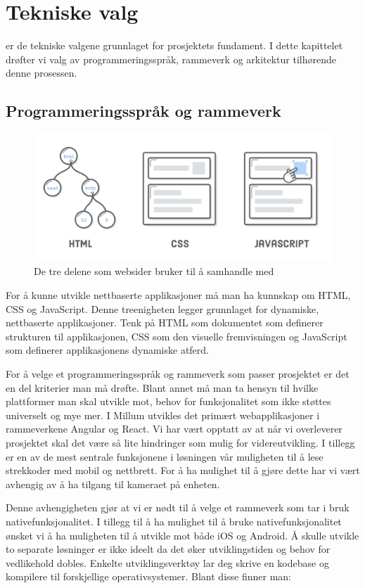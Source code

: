 
\chapter{\color{Millum}\textbf{Tekniske valg}}
 er de tekniske valgene grunnlaget for prosjektets fundament. I dette kapittelet drøfter vi valg av programmeringsspråk, rammeverk og arkitektur tilhørende denne prosessen.

\section{\textbf{Programmeringsspråk og rammeverk}}
\begin{figure} 
\includegraphics[width=\textwidth]{figures/HTML-CSS-JS.png}
\caption{De tre delene som websider bruker til å samhandle med}
\end{figure}
For å kunne utvikle nettbaserte applikasjoner må man ha kunnskap om HTML, CSS og JavaScript. Denne treenigheten legger grunnlaget for dynamiske, nettbaserte applikasjoner. Tenk på HTML som dokumentet som definerer strukturen til applikasjonen, CSS som den visuelle fremvisningen og JavaScript som definerer applikasjonens dynamiske atferd. 

For å velge et programmeringsspråk og rammeverk som passer prosjektet er det en del kriterier man må drøfte. Blant annet må man ta hensyn til hvilke plattformer man skal utvikle mot, behov for funksjonalitet som ikke støttes universelt og mye mer. I Millum utvikles det primært webapplikasjoner i rammeverkene Angular og React. Vi har vært opptatt av at når vi overleverer prosjektet skal det være så lite hindringer som mulig for videreutvikling. I tillegg er en av de mest sentrale funksjonene i løsningen vår muligheten til å lese strekkoder med mobil og nettbrett. For å ha mulighet til å gjøre dette har vi vært avhengig av å ha tilgang til kameraet på enheten. 

Denne avhengigheten gjør at vi er nødt til å velge et rammeverk som tar i bruk nativefunksjonalitet. I tillegg til å ha mulighet til å bruke nativefunksjonalitet ønsket vi å ha muligheten til å utvikle mot både iOS og Android. Å skulle utvikle to separate løsninger er ikke ideelt da det øker utviklingstiden og behov for vedlikehold dobles. Enkelte utviklingsverktøy lar deg skrive en kodebase og kompilere til forskjellige operativsystemer. Blant disse finner man:

